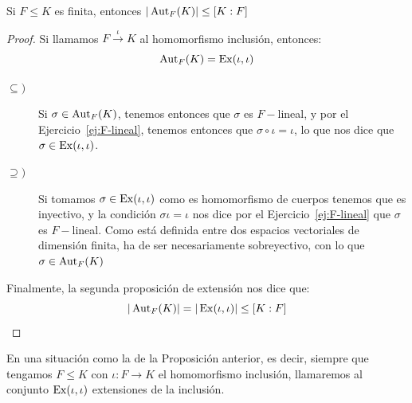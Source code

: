 \begin{prop}\label{prop:comienzo_chap_2}
    Si $F\leq K$ es finita, entonces $|\operatorname{Aut}_F(K)| \leq [K:F]$
    \begin{proof}
        Si llamamos $F\stackrel{\iota}{\to}K$ al homomorfismo inclusión, entonces:
        \begin{equation*}
            \operatorname{Aut}_F(K) = \operatorname{Ex}(\iota, \iota)
        \end{equation*}
        \begin{description}
            \item [$\subseteq )$] Si $\sigma\in \operatorname{Aut}_F(K)$, tenemos entonces que $\sigma$ es $F-$lineal, y por el Ejercicio~\ref{ej:F-lineal}, tenemos entonces que $\sigma\circ\iota = \iota$, lo que nos dice que $\sigma\in \operatorname{Ex}(\iota,\iota)$.
            \item [$\supseteq )$] Si tomamos $\sigma\in \operatorname{Ex}(\iota,\iota)$ como es homomorfismo de cuerpos tenemos que es inyectivo, y la condición $\sigma\iota = \iota$ nos dice por el Ejercicio~\ref{ej:F-lineal} que $\sigma$ es $F-$lineal. Como está definida entre dos espacios vectoriales de dimensión finita, ha de ser necesariamente sobreyectivo, con lo que $\sigma\in \operatorname{Aut}_F(K)$
        \end{description}
        Finalmente, la segunda proposición de extensión nos dice que:
        \begin{equation*}
            |\operatorname{Aut}_F(K)| = |\operatorname{Ex}(\iota,\iota)| \leq [K:F]
        \end{equation*}
    \end{proof}
\end{prop}

\begin{notacion}
    En una situación como la de la Proposición anterior, es decir, siempre que tengamos $F\leq K$ con $\iota:F\to K$ el homomorfismo inclusión, llamaremos al conjunto $\operatorname{Ex}(\iota,\iota)$ extensiones de la inclusión.
\end{notacion}

